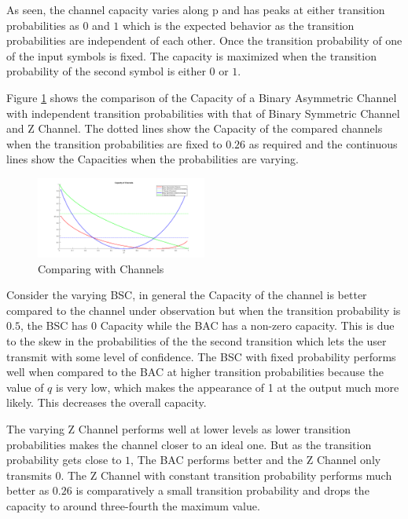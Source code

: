 As seen, the channel capacity varies along p and has peaks at either transition probabilities as $0$ and $1$ which is the expected behavior as the transition probabilities are independent of each other. Once the transition probability of one of the input symbols is fixed. The capacity is maximized when the transition probability of the second symbol is either $0$ or $1$.

Figure \ref{fig:comparison} shows the comparison of the Capacity of a Binary Asymmetric Channel with independent transition probabilities with that of Binary Symmetric Channel and Z Channel. The dotted lines show the Capacity of the compared channels when the transition probabilities are fixed to $0.26$ as required and the continuous lines show the Capacities when the probabilities are varying.

\begin{figure}
    \centering
    \includegraphics[width=0.5\textwidth]{images/comparison.png}
    \caption{Comparing with Channels}
    \label{fig:comparison}
\end{figure}

Consider the varying BSC, in general the Capacity of the channel is better compared to the channel under observation but when the transition probability is $0.5$, the BSC has $0$ Capacity while the BAC has a non-zero capacity. This is due to the skew in the probabilities of the the second transition which lets the user transmit with some level of confidence. The BSC with fixed probability performs well when compared to the BAC at higher transition probabilities because the value of $q$ is very low, which makes the appearance of 1 at the output much more likely. This decreases the overall capacity.

The varying Z Channel performs well at lower levels as lower transition probabilities makes the channel closer to an ideal one. But as the transition probability gets close to $1$, The BAC performs better and the Z Channel only transmits $0$. The Z Channel with constant transition probability performs much better as $0.26$ is comparatively a small transition probability and drops the capacity to around three-fourth the maximum value.
